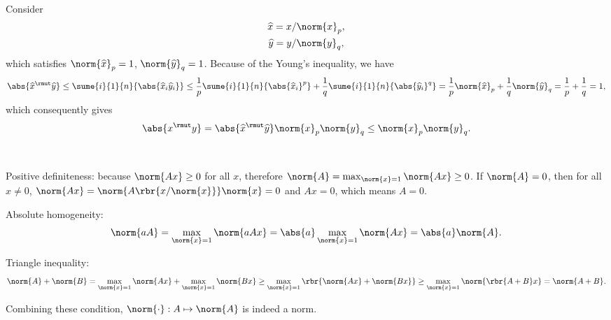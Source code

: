 \documentclass[english, nochinese]{../textmpls/pkupaper}
\title{\titlemark}
\author{\authoring}
\begin{document}
\maketitle

\begin{thmquestion}
\ 
\begin{thmproof}
Consider
\begin{gather}
\widehat{x} = x / \norm{x}_p, \\
\widehat{y} = y / \norm{y}_q,
\end{gather}
which satisfies $ \norm{\widehat{x}}_p = 1 $, $ \norm{\widehat{y}}_q = 1 $. Because of the Young's inequality, we have
\begin{equation}
\abs{ \widehat{x}^{\rmut} \widehat{y} } \le \sume{i}{1}{n}{ \abs{ \widehat{x}_i \widehat{y}_i } } \le \frac{1}{p} \sume{i}{1}{n}{\abs{\widehat{x}_i}^p} + \frac{1}{q} \sume{i}{1}{n}{\abs{\widehat{y}_i}^q} = \frac{1}{p} \norm{\widehat{x}}_p + \frac{1}{q} \norm{\widehat{y}}_q = \frac{1}{p} + \frac{1}{q} = 1,
\end{equation}
which consequently gives
\begin{equation}
\abs{ x^{\rmut} y } = \abs{ \widehat{x}^{\rmut} \widehat{y} } \norm{x}_p \norm{y}_q \le \norm{x}_p \norm{y}_q.
\end{equation}

\sqed
\end{thmproof}
\end{thmquestion}

\begin{thmquestion}
\ 
\begin{thmproof}
\begin{partlist}
\item Positive definiteness: because $ \norm{ A x } \ge 0 $ for all $x$, therefore $ \norm{A} = \max_{ \norm{x} = 1 } \norm{ A x } \ge 0 $. If $ \norm{A} = 0 $, then for all $ x \neq 0 $, $ \norm{ A x } = \norm{ A \rbr{ x / \norm{x} } } \norm{x} = 0 $ and $ A x = 0 $, which means $ A = 0 $.
\item Absolute homogeneity:
\begin{equation}
\norm{ a A } = \max_{ \norm{x} = 1 } \norm{ a A x } = \abs{a} \max_{ \norm{x} = 1 } \norm{ A x } = \abs{a} \norm{A}.
\end{equation}
\item Triangle inequality:
\begin{equation}
\norm{A} + \norm{B} = \max_{ \norm{x} = 1 } \norm{ A x } + \max_{ \norm{x} = 1 } \norm{ B x } \ge \max_{ \norm{x} = 1 } \rbr{ \norm{ A x } + \norm{ B x } } \ge \max_{ \norm{x} = 1 } \norm{ \rbr{ A + B } x } = \norm{ A + B }.
\end{equation}
\end{partlist}

Combining these condition, $ \norm{\cdot} : A \mapsto \norm{A} $ is indeed a norm.

\sqed
\end{thmproof}
\end{thmquestion}
\end{document}
